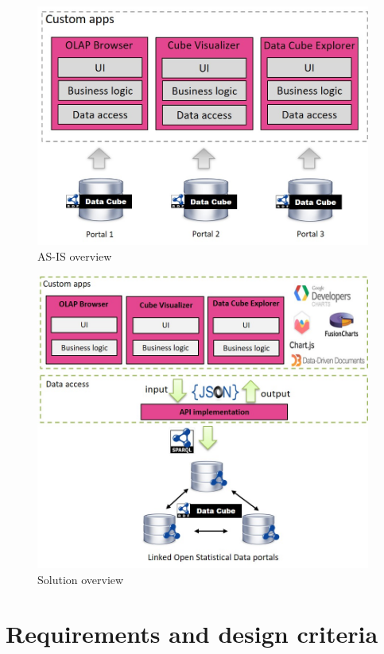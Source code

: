 \documentclass{llncs}
\begin{document}
\begin{figure}
\begin{center}
  \includegraphics[width=110mm]{images/overview1.jpg}
  \end{center}
\caption{AS-IS overview}
\label{fig:overview1}
\end{figure}


\begin{figure}[h!]
  \includegraphics[width=110mm]{images/overview.jpg}
\caption{Solution overview}
\label{fig:overview}
\end{figure}





\section{Requirements and design criteria}\label{sec:reqs}
\end{document}
